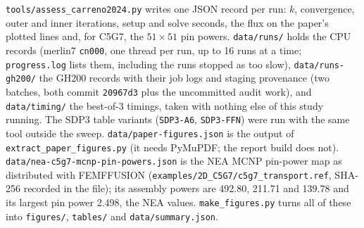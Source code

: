 \documentclass[a4paper,10pt]{article}
\newcommand{\code}[1]{\texttt{#1}}
\begin{document}
\code{tools/assess\_carreno2024.py} writes one JSON record per run: $k$,
convergence, outer and inner iterations, setup and solve seconds, the flux
on the paper's plotted lines and, for C5G7, the $51 \times 51$ pin powers.
\code{data/runs/} holds the CPU records (merlin7 \code{cn000}, one thread per
run, up to 16 runs at a time; \code{progress.log} lists them, including the
runs stopped as too slow), \code{data/runs-gh200/} the GH200 records with
their job logs and staging provenance (two batches, both commit
\code{20967d3} plus the uncommitted audit work), and \code{data/timing/} the
best-of-3 timings, taken with nothing else of this study running. The SDP3
table variants (\code{SDP3-A6}, \code{SDP3-FFN}) were run with the same tool
outside the sweep. \code{data/paper-figures.json} is
the output of \code{extract\_paper\_figures.py} (it needs PyMuPDF; the
report build does not). \code{data/nea-c5g7-mcnp-pin-powers.json} is the
NEA MCNP pin-power map as distributed with FEMFFUSION
(\code{examples/2D\_C5G7/c5g7\_transport.ref}, SHA-256 recorded in the
file); its assembly powers are 492.80, 211.71 and 139.78 and its largest pin
power 2.498, the NEA values. \code{make\_figures.py} turns all of these into
\code{figures/}, \code{tables/} and \code{data/summary.json}.
\end{document}
